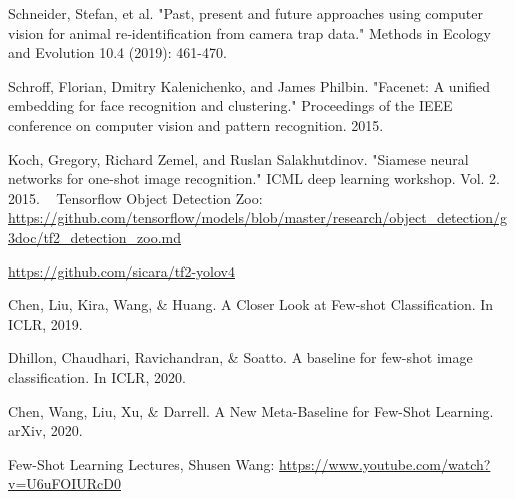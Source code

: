 \documentclass[10pt,twocolumn,letterpaper]{article}
\begin{document}
\begin{thebibliography}{99}
	Schneider, Stefan, et al. "Past, present and future approaches using computer vision for animal re‐identification from camera trap data." Methods in Ecology and Evolution 10.4 (2019): 461-470. 

	Schroff, Florian, Dmitry Kalenichenko, and James Philbin. "Facenet: A unified embedding for face recognition and clustering." Proceedings of the IEEE conference on computer vision and pattern recognition. 2015. 


	Koch, Gregory, Richard Zemel, and Ruslan Salakhutdinov. "Siamese neural networks for one-shot image recognition." ICML deep learning workshop. Vol. 2. 2015. 
 
	Tensorflow Object Detection Zoo: \url{https://github.com/tensorflow/models/blob/master/research/object_detection/g3doc/tf2_detection_zoo.md}

	\url{https://github.com/sicara/tf2-yolov4}

	Chen, Liu, Kira, Wang, \& Huang. A Closer Look at Few-shot Classification. In ICLR, 2019.

	Dhillon, Chaudhari, Ravichandran, \& Soatto. A baseline for few-shot image classification. In ICLR, 2020.

	Chen, Wang, Liu, Xu, \& Darrell. A New Meta-Baseline for Few-Shot Learning. arXiv, 2020.

	Few-Shot Learning Lectures, Shusen Wang: \url{https://www.youtube.com/watch?v=U6uFOIURcD0}

\end{thebibliography}
\end{document}

